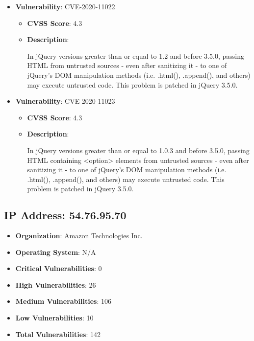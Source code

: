 \documentclass{article}
\begin{document}
\begin{itemize}
        \item \textbf{Vulnerability}: CVE-2020-11022
        \begin{itemize}
            \item \textbf{CVSS Score}:  4.3 
            \item \textbf{Description}:
            \parbox[t]{0.9\linewidth}{
                \ttfamily In jQuery versions greater than or equal to 1.2 and before 3.5.0, passing HTML from untrusted sources - even after sanitizing it - to one of jQuery's DOM manipulation methods (i.e. .html(), .append(), and others) may execute untrusted code. This problem is patched in jQuery 3.5.0.
            }
        \end{itemize}
    
        \item \textbf{Vulnerability}: CVE-2020-11023
        \begin{itemize}
            \item \textbf{CVSS Score}:  4.3 
            \item \textbf{Description}:
            \parbox[t]{0.9\linewidth}{
                \ttfamily In jQuery versions greater than or equal to 1.0.3 and before 3.5.0, passing HTML containing <option> elements from untrusted sources - even after sanitizing it - to one of jQuery's DOM manipulation methods (i.e. .html(), .append(), and others) may execute untrusted code. This problem is patched in jQuery 3.5.0.
            }
        \end{itemize}
    
\end{itemize}




\clearpage



\subsection{IP Address: 54.76.95.70}

\begin{itemize}
    \item \textbf{Organization}: Amazon Technologies Inc.
    \item \textbf{Operating System}:  N/A 
    \item \textbf{Critical Vulnerabilities}: 0
    \item \textbf{High Vulnerabilities}: 26
    \item \textbf{Medium Vulnerabilities}: 106
    \item \textbf{Low Vulnerabilities}: 10
    \item \textbf{Total Vulnerabilities}: 142
\end{itemize}
\end{document}
